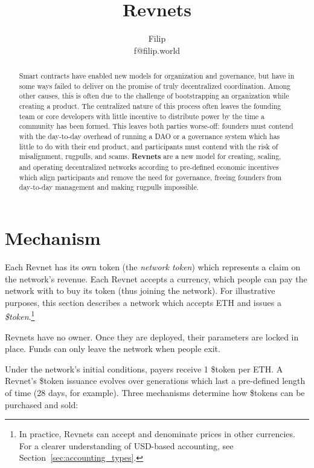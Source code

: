\documentclass{article}
\title{Revnets}
\author{Filip\\f@filip.world}
\begin{document}
\maketitle

\begin{abstract}
  Smart contracts have enabled new models for organization and governance, but have in some ways failed to deliver on the promise of truly decentralized coordination. Among other causes, this is often due to the challenge of bootstrapping an organization while creating a product. The centralized nature of this process often leaves the founding team or core developers with little incentive to distribute power by the time a community has been formed. This leaves both parties worse-off: founders must contend with the day-to-day overhead of running a DAO or a governance system which has little to do with their end product, and participants must contend with the risk of misalignment, rugpulls, and scams. \textbf{Revnets} are a new model for creating, scaling, and operating decentralized networks according to pre-defined economic incentives which align participants and remove the need for governance, freeing founders from day-to-day management and making rugpulls impossible.
\end{abstract}

\section{Mechanism}

Each Revnet has its own token (the \textit{network token}) which represents a claim on the network's revenue. Each Revnet accepts a currency, which people can pay the network with to buy its token (thus joining the network). For illustrative purposes, this section describes a network which accepts ETH and issues a \textit{\$token}.\footnote{In practice, Revnets can accept and denominate prices in other currencies. For a clearer understanding of USD-based accounting, see Section~\ref{sec:accounting_types}.}

Revnets have no owner. Once they are deployed, their parameters are locked in place. Funds can only leave the network when people exit.

Under the network's initial conditions, payers receive 1 \$token per ETH. A Revnet's \$token issuance evolves over generations which last a pre-defined length of time (28 days, for example). Three mechanisms determine how \$tokens can be purchased and sold:
\end{document}
